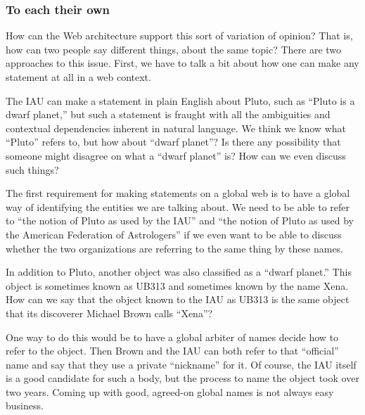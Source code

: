\subsubsection{To each their own}

How can the Web architecture support this sort of variation of opinion?
That is, how can two people say different things, about the same topic?
There are two approaches to this issue. First, we have to talk a bit
about how one can make any statement at all in a web context.

The IAU can make a statement in plain English about Pluto, such as
``Pluto is a dwarf planet,'' but such a statement is fraught with all
the ambiguities and contextual dependencies inherent in natural
language. We think we know what ``Pluto'' refers to, but how about
``dwarf planet''? Is there any possibility that someone might disagree
on what a ``dwarf planet'' is? How can we even discuss such things?

The first requirement for making statements on a global web is to have a
global way of identifying the entities we are talking about. We need to
be able to refer to ``the notion of Pluto as used by the IAU'' and ``the
notion of Pluto as used by the American Federation of Astrologers'' if
we even want to be able to discuss whether the two organizations are
referring to the same thing by these names.

In addition to Pluto, another object was also classified as a ``dwarf
planet.'' This object is sometimes known as UB313 and sometimes known by
the name Xena. How can we say that the object known to the IAU as UB313
is the same object that its discoverer Michael Brown calls ``Xena''?

One way to do this would be to have a global arbiter of names decide how
to refer to the object. Then Brown and the IAU can both refer to that
``official'' name and say that they use a private ``nickname'' for it.
Of course, the IAU itself is a good candidate for such a body, but the
process to name the object took over two years. Coming up with good,
agreed-on global names is not always easy business.

